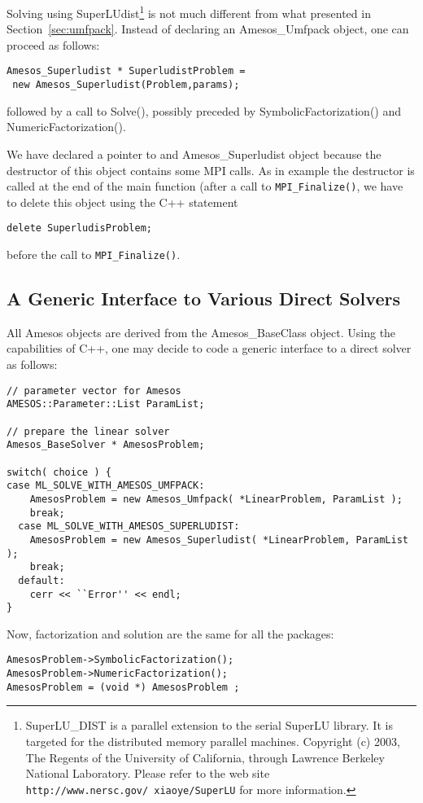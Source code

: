 Solving using SuperLUdist\footnote{SuperLU\_DIST is a parallel extension
  to the  serial SuperLU library.   It  is targeted for the  distributed
  memory parallel  machines. 
Copyright (c) 2003, The Regents of the University of California, through
Lawrence Berkeley National Laboratory.
Please refer
  to  the  web site {\tt  http://www.nersc.gov/~xiaoye/SuperLU} for more
  information.}  is not   much  different    from  what presented     in
Section~\ref{sec:umfpack}.    Instead of   declaring  an Amesos\_Umfpack
object, one can proceed as follows:
\begin{verbatim}
Amesos_Superludist * SuperludistProblem = 
 new Amesos_Superludist(Problem,params);
\end{verbatim}
followed by a call to Solve(), possibly preceded by
SymbolicFactorization() and NumericFactorization().

\begin{remark}
  We have declared a pointer to and Amesos\_Superludist object because
  the destructor of this object contains some MPI
  calls. As in example \newline {} the destructor is called
  at the end of the main function (after a call to
  \verb!MPI_Finalize()!, we have to delete this object using the C++
  statement
\begin{verbatim}
delete SuperludisProblem;
\end{verbatim}
  before the call to \verb!MPI_Finalize()!.
\end{remark}


\subsection{A Generic Interface to Various Direct Solvers}
\label{sec:amesos_generic}

All Amesos objects are derived from the Amesos\_BaseClass object. Using
the capabilities of C++, one may decide to code a generic interface to a
direct solver as follows:
\begin{verbatim}
// parameter vector for Amesos
AMESOS::Parameter::List ParamList;

// prepare the linear solver
Amesos_BaseSolver * AmesosProblem;

switch( choice ) {
case ML_SOLVE_WITH_AMESOS_UMFPACK:
    AmesosProblem = new Amesos_Umfpack( *LinearProblem, ParamList );
    break;
  case ML_SOLVE_WITH_AMESOS_SUPERLUDIST:
    AmesosProblem = new Amesos_Superludist( *LinearProblem, ParamList );
    break;
  default:
    cerr << ``Error'' << endl;
}
\end{verbatim}

Now, factorization and solution are the same for all the packages:
\begin{verbatim}  
AmesosProblem->SymbolicFactorization();
AmesosProblem->NumericFactorization();
AmesosProblem = (void *) AmesosProblem ;
\end{verbatim}


